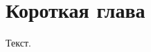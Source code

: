 \documentclass[a4paper,12pt]{report}
\begin{document}
\titlePage
\clearpage
\tableofcontents
\chapter{Короткая глава}
Текст.
\end{document}
